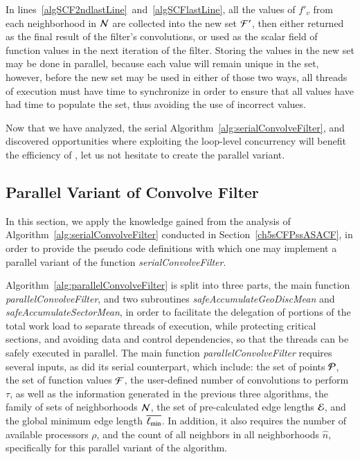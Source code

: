 In lines~\ref{algSCF2ndlastLine}~and~\ref{algSCFlastLine}, all the values of $f'_v$ from each neighborhood in $\mathcal{N}$ are collected into the new set $\mathcal{F}'$, then either returned as the final result of the filter's convolutions, or used as the scalar field of function values in the next iteration of the filter. Storing the values in the new set may be done in parallel, because each value will remain unique in the set, however, before the new set may be used in either of those two ways, all threads of execution must have time to synchronize in order to ensure that all values have had time to populate the set, thus avoiding the use of incorrect values.

Now that we have analyzed, the serial Algorithm~\ref{alg:serialConvolveFilter}, and discovered opportunities where exploiting the loop-level concurrency will benefit the efficiency of , let us not hesitate to create the parallel variant.

%
%
\subsection{Parallel Variant of Convolve Filter}
\label{ch5sCFPssPRCN}
In this section, we apply the knowledge gained from the analysis of Algorithm~\ref{alg:serialConvolveFilter} conducted in Section~\ref{ch5sCFPssASACF}, in order to provide the pseudo code definitions with which one may implement a parallel variant of the function \textit{serialConvolveFilter}.

Algorithm~\ref{alg:parallelConvolveFilter} is split into three parts, the main function \textit{parallelConvolveFilter}, and two subroutines \textit{safeAccumulateGeoDiscMean} and \textit{safeAccumulateSectorMean}, in order to facilitate the delegation of portions of the total work load to separate threads of execution, while protecting critical sections, and avoiding data and control dependencies, so that the threads can be safely executed in parallel. The main function \textit{parallelConvolveFilter} requires several inputs, as did its serial counterpart, which include: the set of points $\mathcal{P}$, the set of function values $\mathcal{F}$, the user-defined number of convolutions to perform $\tau$, as well as the information generated in the previous three algorithms, the family of sets of neighborhoods $\mathcal{N}$, the set of pre-calculated edge lengths $\mathcal{E}$, and the global minimum edge length $\overline{\ell_\text{min}}$. In addition, it also requires the number of available processors $\rho$, and the count of all neighbors in all neighborhoods $\hat{n}$, specifically for this parallel variant of the algorithm.

